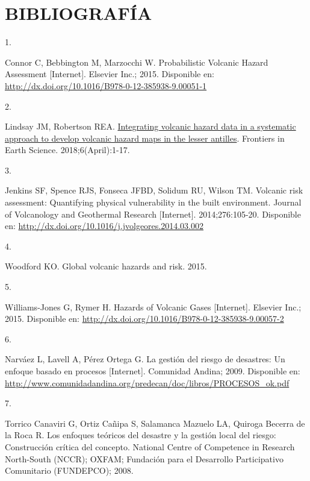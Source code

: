 \documentclass[
  spanish,
  letterpaper,
]{book}
\newlength{\cslhangindent}
\newlength{\csllabelwidth}
\newenvironment{CSLReferences}[2] %
 {\begin{list}{}{%
  \setlength{\itemindent}{0pt}
  \setlength{\leftmargin}{0pt}
  \setlength{\parsep}{0pt}
  \ifodd #1
   \setlength{\leftmargin}{\cslhangindent}
   \setlength{\itemindent}{-1\cslhangindent}
  \fi
  \setlength{\itemsep}{#2\baselineskip}}}
 {\end{list}}
\newcommand{\CSLLeftMargin}[1]{\parbox[t]{\csllabelwidth}{\strut#1\strut}}
\newcommand{\CSLRightInline}[1]{\parbox[t]{\linewidth - \csllabelwidth}{\strut#1\strut}}
\begin{document}

\chapter{BIBLIOGRAFÍA}\label{bibliografuxeda-1}

\label{refs}
\begin{CSLReferences}{0}{1}
\CSLLeftMargin{1. }%
\CSLRightInline{Connor C, Bebbington M, Marzocchi W. Probabilistic
Volcanic Hazard Assessment {[}Internet{]}. Elsevier Inc.; 2015.
Disponible en:
\url{http://dx.doi.org/10.1016/B978-0-12-385938-9.00051-1}}

\CSLLeftMargin{2. }%
\CSLRightInline{Lindsay JM, Robertson REA.
\href{https://doi.org/10.3389/feart.2018.00042}{Integrating volcanic
hazard data in a systematic approach to develop volcanic hazard maps in
the lesser antilles}. Frontiers in Earth Science. 2018;6(April):1-17. }

\CSLLeftMargin{3. }%
\CSLRightInline{Jenkins SF, Spence RJS, Fonseca JFBD, Solidum RU, Wilson
TM. Volcanic risk assessment: Quantifying physical vulnerability in the
built environment. Journal of Volcanology and Geothermal Research
{[}Internet{]}. 2014;276:105-20. Disponible en:
\url{http://dx.doi.org/10.1016/j.jvolgeores.2014.03.002}}

\CSLLeftMargin{4. }%
\CSLRightInline{Woodford KO. Global volcanic hazards and risk. 2015. }

\CSLLeftMargin{5. }%
\CSLRightInline{Williams-Jones G, Rymer H. Hazards of Volcanic Gases
{[}Internet{]}. Elsevier Inc.; 2015. Disponible en:
\url{http://dx.doi.org/10.1016/B978-0-12-385938-9.00057-2}}

\CSLLeftMargin{6. }%
\CSLRightInline{Narváez L, Lavell A, Pérez Ortega G. La gestión del
riesgo de desastres: Un enfoque basado en procesos {[}Internet{]}.
Comunidad Andina; 2009. Disponible en:
\url{http://www.comunidadandina.org/predecan/doc/libros/PROCESOS_ok.pdf}}

\CSLLeftMargin{7. }%
\CSLRightInline{Torrico Canaviri G, Ortiz Cañipa S, Salamanca Mazuelo
LA, Quiroga Becerra de la Roca R. Los enfoques teóricos del desastre y
la gestión local del riesgo: Construcción crítica del concepto. National
Centre of Competence in Research North-South (NCCR); OXFAM; Fundación
para el Desarrollo Participativo Comunitario (FUNDEPCO); 2008. }


\end{CSLReferences}
\end{document}
